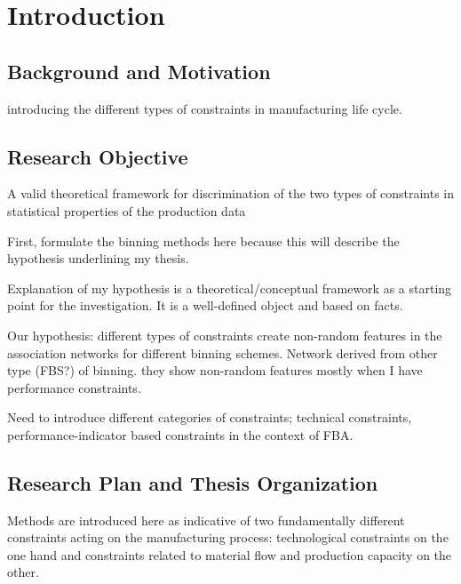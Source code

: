 \chapter{Introduction}

\section{Background and Motivation}
{\color{red} 
	introducing the different types of constraints in manufacturing life cycle.
	
}
\clearpage
\section{Research Objective}

{\color{red} 
	
	A valid theoretical framework for discrimination of the two types of constraints in statistical properties of the production data
	
	First, formulate the binning methods here because this will describe the hypothesis underlining my thesis.
	
	Explanation of my hypothesis is a theoretical/conceptual framework as a starting point for the investigation. It is a well-defined object and based on facts.
	
	Our hypothesis: different types of constraints create non-random features in the association networks for different binning schemes. Network derived from other type (FBS?) of binning. they show non-random features mostly when I have performance constraints.
	
	Need to introduce different categories of constraints; technical constraints, performance-indicator based constraints in the context of FBA.
	
}

\section{Research Plan and Thesis Organization}

{\color{red} 
	
	Methods are introduced here as indicative of two fundamentally different constraints acting on the manufacturing process: technological constraints on the one hand and constraints related to material flow and production capacity on the other.
	
}